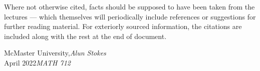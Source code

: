 Where not otherwise cited, facts should be supposed to have been taken from the lectures — which themselves will periodically include references or suggestions for further reading material. For exteriorly sourced information, the citations are included along with the rest at the end of document.



\vspace{\baselineskip}
\begin{flushright}\noindent
McMaster University,\hfill {\it Alun  Stokes}\\
April 2022\hfill {\it MATH 712}\\
\end{flushright}


